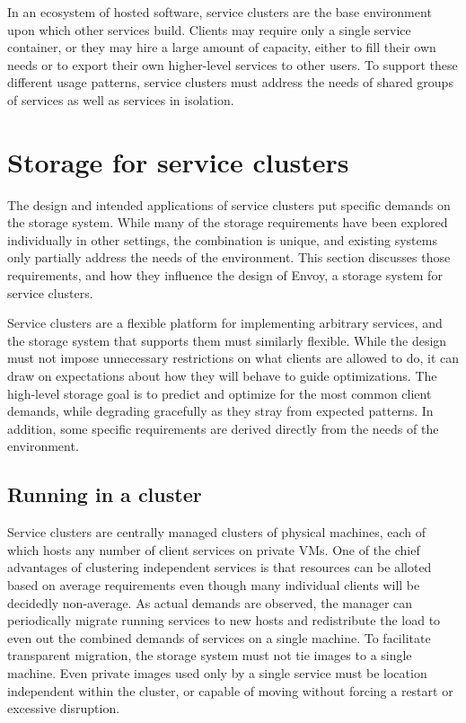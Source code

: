 In an ecosystem of hosted software, service clusters are the base environment upon which other services build. Clients may require only a single service container, or they may hire a large amount of capacity, either to fill their own needs or to export their own higher-level services to other users. To support these different usage patterns, service clusters must address the needs of shared groups of services as well as services in isolation.

\section{Storage for service clusters}

The design and intended applications of service clusters put specific demands on the storage system. While many of the storage requirements have been explored individually in other settings, the combination is unique, and existing systems only partially address the needs of the environment. This section discusses those requirements, and how they influence the design of Envoy, a storage system for service clusters.

Service clusters are a flexible platform for implementing arbitrary services, and the storage system that supports them must similarly flexible. While the design must not impose unnecessary restrictions on what clients are allowed to do, it can draw on expectations about how they will behave to guide optimizations. The high-level storage goal is to predict and optimize for the most common client demands, while degrading gracefully as they stray from expected patterns. In addition, some specific requirements are derived directly from the needs of the environment.

\subsection{Running in a cluster}

Service clusters are centrally managed clusters of physical machines, each of which hosts any number of client services on private VMs. One of the chief advantages of clustering independent services is that resources can be alloted based on average requirements even though many individual clients will be decidedly non-average. As actual demands are observed, the manager can periodically migrate running services to new hosts and redistribute the load to even out the combined demands of services on a single machine. To facilitate transparent migration, the storage system must not tie images to a single machine. Even private images used only by a single service must be location independent within the cluster, or capable of moving without forcing a restart or excessive disruption.


